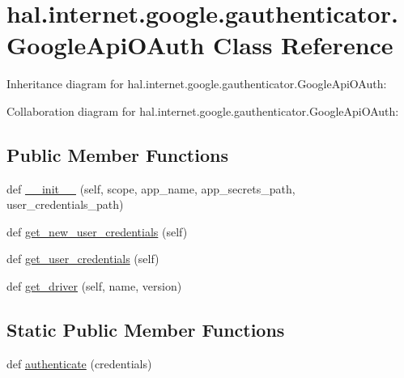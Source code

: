 \hypertarget{classhal_1_1internet_1_1google_1_1gauthenticator_1_1_google_api_o_auth}{}\section{hal.\+internet.\+google.\+gauthenticator.\+Google\+Api\+O\+Auth Class Reference}
\label{classhal_1_1internet_1_1google_1_1gauthenticator_1_1_google_api_o_auth}


Inheritance diagram for hal.\+internet.\+google.\+gauthenticator.\+Google\+Api\+O\+Auth\+:


Collaboration diagram for hal.\+internet.\+google.\+gauthenticator.\+Google\+Api\+O\+Auth\+:
\subsection*{Public Member Functions}
\begin{DoxyCompactItemize}
\item 
def \hyperlink{classhal_1_1internet_1_1google_1_1gauthenticator_1_1_google_api_o_auth_af11aeca8ee0d22064023322c4c18389a}{\+\_\+\+\_\+init\+\_\+\+\_\+} (self, scope, app\+\_\+name, app\+\_\+secrets\+\_\+path, user\+\_\+credentials\+\_\+path)
\item 
def \hyperlink{classhal_1_1internet_1_1google_1_1gauthenticator_1_1_google_api_o_auth_a085c6a559df073a38992b1b290b20aac}{get\+\_\+new\+\_\+user\+\_\+credentials} (self)
\item 
def \hyperlink{classhal_1_1internet_1_1google_1_1gauthenticator_1_1_google_api_o_auth_ac2c9d6193e1fc503225f8fe286dd805e}{get\+\_\+user\+\_\+credentials} (self)
\item 
def \hyperlink{classhal_1_1internet_1_1google_1_1gauthenticator_1_1_google_api_o_auth_a97709e41022ff35b2254d75af7e310f7}{get\+\_\+driver} (self, name, version)
\end{DoxyCompactItemize}
\subsection*{Static Public Member Functions}
\begin{DoxyCompactItemize}
\item 
def \hyperlink{classhal_1_1internet_1_1google_1_1gauthenticator_1_1_google_api_o_auth_a4be15cdb0916e59f05793799f363bc41}{authenticate} (credentials)
\end{DoxyCompactItemize}
